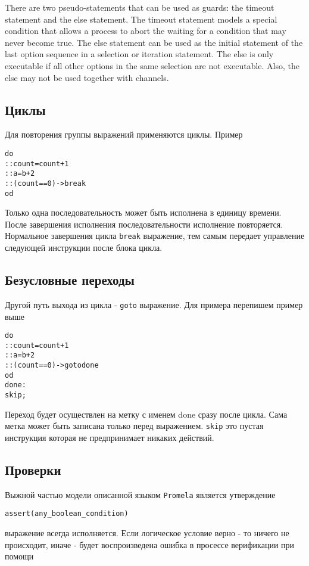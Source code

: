 \documentclass[12pt, twoside]{report}
\begin{document}
There are two pseudo-statements that can be used as guards: the timeout statement
and the else statement. The timeout statement models a special condition that allows
a process to abort the waiting for a condition that may never become true. The else
statement can be used as the initial statement of the last option sequence in a selection
or iteration statement. The else is only executable if all other options in the same
 selection are not executable. Also, the else may not be used together with channels.

\subsection*{Циклы}\label{promela_language_LOOP}

Для повторения группы выражений применяются циклы. Пример
\begin{alltt}
do
  :: count = count + 1
  :: a = b + 2
  :: (count == 0) -> break
od
\end{alltt}
Только одна последовательность может быть исполнена в единицу времени. После
завершения исполнения последовательности исполнение повторяется. Нормальное
завершения цикла \texttt{break} выражение, тем самым передает управление следующей
инструкции после блока цикла.

\subsection*{Безусловные переходы}\label{promela_language_GOTO}

Другой путь выхода из цикла - \texttt{goto} выражение. Для примера перепишем пример выше
\begin{alltt}
do
  :: count = count + 1
  :: a = b + 2
  :: (count == 0) -> goto done
od
done:
  skip;
\end{alltt}
Переход будет осуществлен на метку с именем done сразу после цикла. Сама метка
может быть записана только перед выражением. \texttt{skip} это пустая инструкция которая
не предпринимает никаких действий.


\subsection*{Проверки}\label{promela_language_ASSERT}

Выжной частью модели описанной языком \texttt{Promela} является утверждение
\begin{alltt}
assert(any_boolean_condition)
\end{alltt}
выражение всегда исполняется. Если логическое условие верно - то ничего не
происходит, иначе - будет воспроизведена ошибка в просессе верификации
 при помощи 
\end{document}

